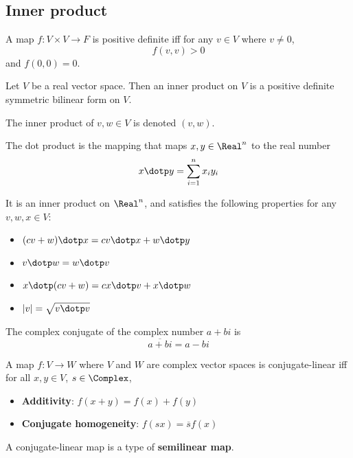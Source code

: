 \subsection{Inner product}


\begin{definition}
  A map $f : V \times V \to F$ is positive definite iff for any $v \in V$ where $v \neq 0$,
  \[
    f(v, v) > 0
  \]
  and $f(0, 0) = 0$.
\end{definition}

\begin{definition}
  Let $V$ be a real vector space. Then an inner product on $V$ is a positive definite symmetric bilinear form on $V$.

  The inner product of $v, w \in V$ is denoted $(v, w)$.
\end{definition}

\begin{definition}
  The dot product is the mapping that maps $x, y \in \Real^n$ to the real number
  \[
    x \dotp y = \sum_{i=1}^n x_i y_i
  \]

  It is an inner product on $\Real^n$, and satisfies the following properties for any $v, w, x \in V$:
  \begin{itemize}
    \item $(cv + w) \dotp x = cv \dotp x + w \dotp y$
    \item $v \dotp w = w \dotp v$
    \item $x \dotp (cv + w) = cx \dotp v + x \dotp w$
    \item $|v| = \sqrt{v \dotp v}$
  \end{itemize}
\end{definition}

\begin{definition}
  The complex conjugate of the complex number $a + bi$ is
  \[
    \overline{a + bi} = a - bi
  \]
\end{definition}

\begin{definition}
  A map $f : V \to W$ where $V$ and $W$ are complex vector spaces is conjugate-linear iff for all $x, y \in V$, $s \in \Complex$,
  \begin{itemize}
    \item \textbf{Additivity}: $f(x + y) = f(x) + f(y)$
    \item \textbf{Conjugate homogeneity}: $f(sx) = \overline{s} f(x)$
  \end{itemize}

  A conjugate-linear map is a type of \textbf{semilinear map}.
\end{definition}

